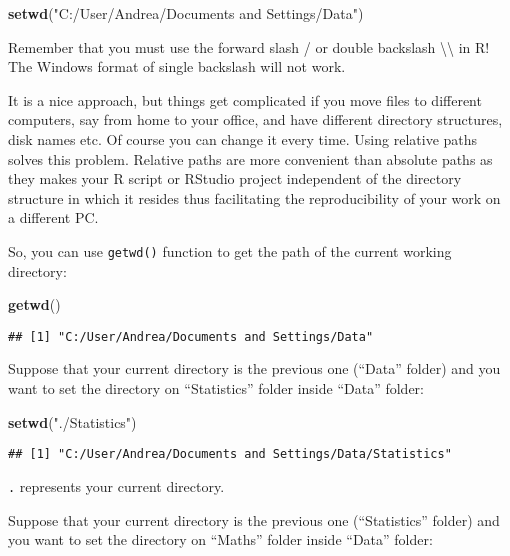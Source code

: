\documentclass[]{book}
\newenvironment{Shaded}{\begin{snugshade}}{\end{snugshade}}
\newcommand{\KeywordTok}[1]{\textcolor[rgb]{0.13,0.29,0.53}{\textbf{{#1}}}}
\newcommand{\StringTok}[1]{\textcolor[rgb]{0.31,0.60,0.02}{{#1}}}
\newcommand{\NormalTok}[1]{{#1}}
\begin{document}
\begin{Shaded}
\begin{Highlighting}[]
\KeywordTok{setwd}\NormalTok{(}\StringTok{"C:/User/Andrea/Documents and Settings/Data"}\NormalTok{)}
\end{Highlighting}
\end{Shaded}

Remember that you must use the forward slash / or double backslash
\textbackslash{}\textbackslash{} in R! The Windows format of single
backslash will not work.

It is a nice approach, but things get complicated if you move files to
different computers, say from home to your office, and have different
directory structures, disk names etc. Of course you can change it every
time. Using relative paths solves this problem. Relative paths are more
convenient than absolute paths as they makes your R script or RStudio
project independent of the directory structure in which it resides thus
facilitating the reproducibility of your work on a different PC.

So, you can use \texttt{getwd()} function to get the path of the current
working directory:

\begin{Shaded}
\begin{Highlighting}[]
\KeywordTok{getwd}\NormalTok{()}
\end{Highlighting}
\end{Shaded}

\begin{verbatim}
## [1] "C:/User/Andrea/Documents and Settings/Data"
\end{verbatim}

Suppose that your current directory is the previous one (``Data''
folder) and you want to set the directory on ``Statistics'' folder
inside ``Data'' folder:

\begin{Shaded}
\begin{Highlighting}[]
\KeywordTok{setwd}\NormalTok{(}\StringTok{"./Statistics"}\NormalTok{)}
\end{Highlighting}
\end{Shaded}

\begin{verbatim}
## [1] "C:/User/Andrea/Documents and Settings/Data/Statistics"
\end{verbatim}

\texttt{.} represents your current directory.

Suppose that your current directory is the previous one (``Statistics''
folder) and you want to set the directory on ``Maths'' folder inside
``Data'' folder:
\end{document}

